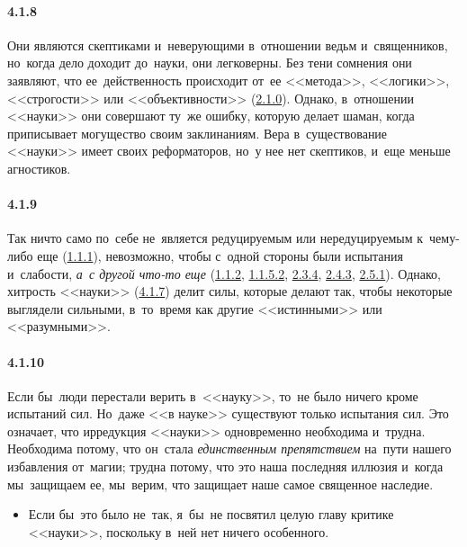 \paragraph{4.1.8}\hypertarget{par:4.1.8}{} Они являются скептиками и~неверующими в~отношении ведьм и~священников, но~когда дело доходит до~науки, они легковерны. Без тени сомнения они заявляют, что ее~действенность происходит от~ее <<метода>>, <<логики>>, <<строгости>> или <<объективности>> (\hyperlink{par:2.1.0}{2.1.0}). Однако, в~отношении <<науки>> они совершают ту~же ошибку, которую делает шаман, когда приписывает могущество своим заклинаниям. Вера в~существование <<науки>> имеет своих реформаторов, но~у нее нет скептиков, и~еще меньше агностиков.


\paragraph{4.1.9}\hypertarget{par:4.1.9}{} Так ничто само по~себе не~является редуцируемым или нередуцируемым к~чему-либо еще (\hyperlink{par:1.1.1}{1.1.1}), невозможно, чтобы с~одной стороны были испытания и~слабости, {\itshape а~с другой что-то еще} (\hyperlink{par:1.1.2}{1.1.2}, \hyperlink{par:1.1.5.2}{1.1.5.2}, \hyperlink{par:2.3.4}{2.3.4}, \hyperlink{par:2.4.3}{2.4.3}, \hyperlink{par:2.5.1}{2.5.1}). Однако, хитрость <<науки>> (\hyperlink{par:4.1.7}{4.1.7}) делит силы, которые делают так, чтобы некоторые выглядели сильными, в~то~время как другие <<истинными>> или <<разумными>>.

\paragraph{4.1.10}\hypertarget{par:4.1.10}{}Если бы~люди перестали верить в~<<науку>>, то~не было ничего кроме испытаний сил. Но~даже <<в науке>> существуют только испытания сил. Это означает, что ирредукция <<науки>> одновременно необходима и~трудна. Необходима потому, что он~стала {\itshape единственным препятствием} на~пути нашего избавления от~магии; трудна потому, что это наша последняя иллюзия и~когда мы~защищаем ее, мы~верим, что защищает наше самое священное наследие. 
	\begin{itemize}
	\item 
	Если бы~это было не~так, я~бы~не посвятил целую главу критике <<науки>>, поскольку в~ней нет ничего особенного. 
	\end{itemize}	 




